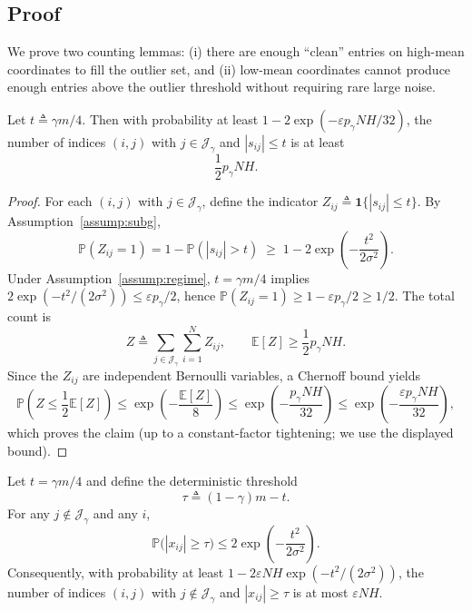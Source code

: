 \subsection{Proof}

We prove two counting lemmas: (i) there are enough ``clean'' entries on high-mean
coordinates to fill the outlier set, and (ii) low-mean coordinates cannot produce
enough entries above the outlier threshold without requiring rare large noise.

\begin{lemma}
\label{lem:many_clean_highmean}
Let $t \triangleq \gamma m/4$.
Then with probability at least $1-2\exp(-\varepsilon p_\gamma NH/32)$, the number of
indices $(i,j)$ with $j\in\mathcal{J}_\gamma$ and $|s_{ij}|\le t$ is at least
\[
\frac{1}{2}p_\gamma NH.
\]
\end{lemma}

\begin{proof}
For each $(i,j)$ with $j\in\mathcal{J}_\gamma$, define the indicator
$Z_{ij} \triangleq \mathbf{1}\{|s_{ij}|\le t\}$.
By Assumption~\ref{assump:subg},
\[
\mathbb{P}(Z_{ij}=1) = 1-\mathbb{P}(|s_{ij}|>t)
\;\ge\;
1-2\exp\!\left(-\frac{t^2}{2\sigma^2}\right).
\]
Under Assumption~\ref{assump:regime}, $t=\gamma m/4$ implies
$2\exp(-t^2/(2\sigma^2)) \le \varepsilon p_\gamma/2$,
hence $\mathbb{P}(Z_{ij}=1)\ge 1-\varepsilon p_\gamma/2\ge 1/2$.
The total count is
\[
Z \triangleq \sum_{j\in\mathcal{J}_\gamma}\sum_{i=1}^N Z_{ij},
\qquad
\mathbb{E}[Z] \ge \frac{1}{2} p_\gamma NH.
\]
Since the $Z_{ij}$ are independent Bernoulli variables, a Chernoff bound yields
\[
\mathbb{P}\!\left(Z \le \frac{1}{2}\mathbb{E}[Z]\right)
\le
\exp\!\left(-\frac{\mathbb{E}[Z]}{8}\right)
\le
\exp\!\left(-\frac{p_\gamma NH}{32}\right)
\le
\exp\!\left(-\frac{\varepsilon p_\gamma NH}{32}\right),
\]
which proves the claim (up to a constant-factor tightening; we use the displayed bound).
\end{proof}

\begin{lemma}
\label{lem:lowmean_rare}
Let $t=\gamma m/4$ and define the deterministic threshold
\[
\tau \triangleq (1-\gamma)m - t.
\]
For any $j\notin\mathcal{J}_\gamma$ and any $i$,
\[
\mathbb{P}\big(|x_{ij}|\ge \tau\big)
\le
2\exp\!\left(-\frac{t^2}{2\sigma^2}\right).
\]
Consequently, with probability at least $1-2\varepsilon NH\exp(-t^2/(2\sigma^2))$,
the number of indices $(i,j)$ with $j\notin\mathcal{J}_\gamma$ and $|x_{ij}|\ge\tau$
is at most $\varepsilon NH$.
\end{lemma}

